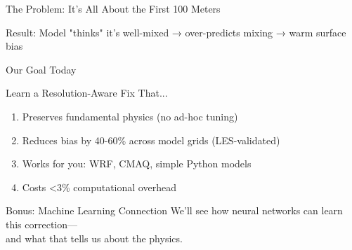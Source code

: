 \documentclass[10pt,aspectratio=169]{beamer}
\begin{document}
\begin{frame}{The Problem: It's All About the First 100 Meters}
  \begin{center}
  \end{center}
  
  \vspace{0.3cm}
  \alert{Result:} Model "thinks" it's well-mixed → over-predicts mixing → warm surface bias
\end{frame}

\begin{frame}{Our Goal Today}
  \begin{block}{Learn a Resolution-Aware Fix That...}
    \begin{enumerate}
      \item Preserves \alert{fundamental physics} (no ad-hoc tuning)
      \item Reduces bias by \alert{40-60\%} across model grids (LES-validated)
      \item Works for \alert{you}: WRF, CMAQ, simple Python models
      \item Costs \alert{<3\%} computational overhead
    \end{enumerate}
  \end{block}
  
  \vspace{0.5cm}
  \begin{exampleblock}{Bonus: Machine Learning Connection}
    We'll see how neural networks can \alert{learn} this correction—\\
    and what that tells us about the physics.
  \end{exampleblock}
\end{frame}
\end{document}
